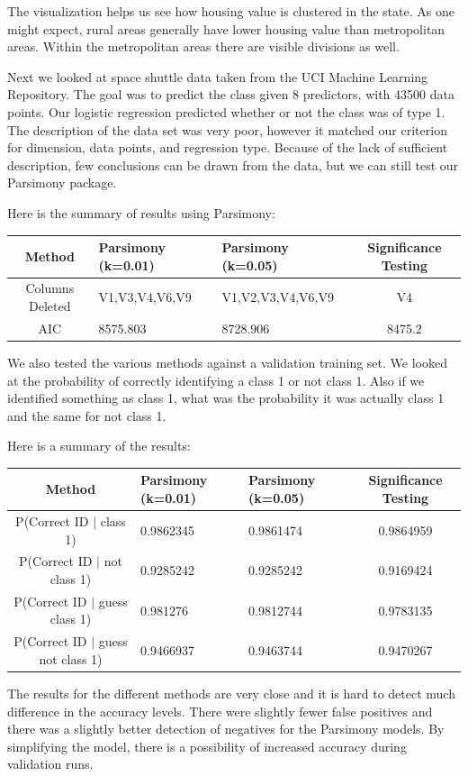 \documentclass[letter]{article}
\begin{document}
The visualization helps us see how housing value is clustered in the state. As one might expect, rural areas generally have lower housing value than metropolitan areas. Within the metropolitan areas there are visible divisions as well. 

\newpage
Next we looked at space shuttle data taken from the UCI Machine Learning Repository. The goal was to predict the class given 8 predictors, with 43500 data points. Our logistic regression predicted whether or not the class was of type 1.  The description of the data set was very poor, however it matched our criterion for dimension, data points, and regression type. Because of the lack of sufficient description, few conclusions can be drawn from the data, but we can still test our Parsimony package.

Here is the summary of results using Parsimony:

\begin{tabular}{ | c | p{3cm} | p{3.3cm} | c  |}
\hline
Method&Parsimony (k=0.01) & Parsimony (k=0.05) & Significance Testing \\
\hline
Columns Deleted& V1,V3,V4,V6,V9 & V1,V2,V3,V4,V6,V9 & V4 \\
\hline
AIC & 8575.803 & 8728.906 & 8475.2 \\
\hline
\end{tabular}

We also tested the various methods against a validation training set. We looked at the probability of correctly identifying a class 1 or not class 1. Also if we identified something as class 1, what was the probability it was actually class 1 and the same for not class 1.

Here is a summary of the results:

\begin{tabular}{ | c | p{3cm} | p{3.3cm} | c  |}
\hline
Method&Parsimony (k=0.01) & Parsimony (k=0.05) & Significance Testing \\
\hline
P(Correct ID $|$ class 1) & 0.9862345 & 0.9861474 & 0.9864959 \\
\hline
P(Correct ID $|$ not class 1) & 0.9285242 & 0.9285242 & 0.9169424 \\
\hline
P(Correct ID $|$ guess class 1) & 0.981276 & 0.9812744 & 0.9783135 \\
\hline
P(Correct ID $|$ guess not class 1) & 0.9466937 & 0.9463744 & 0.9470267  \\
\hline
\end{tabular}

The results for the different methods are very close and it is hard to detect much difference in the accuracy levels. There were slightly fewer false positives and there was a slightly better detection of negatives for the Parsimony models. By simplifying the model, there is a possibility of increased accuracy during validation runs.
\\
\\
\end{document}
